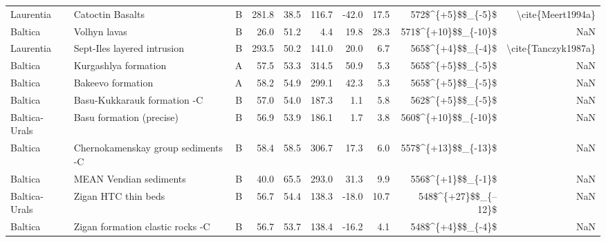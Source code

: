 \begin{longtable}{p{1 in}p{1 in}rrrrrrrr}
                     Laurentia &                                   Catoctin Basalts &      B &     281.8 &      38.5 & 116.7 & -42.0 &      17.5 &      572\$\textasciicircum \{+5\}\$\$\_\{-5\}\$ &                                  \textbackslash cite\{Meert1994a\} \\
                       Baltica &                                       Volhyn lavas &      B &      26.0 &      51.2 &   4.4 &  19.8 &      28.3 &    571\$\textasciicircum \{+10\}\$\$\_\{-10\}\$ &                                                NaN \\
                     Laurentia &                        Sept-Iles layered intrusion &      B &     293.5 &      50.2 & 141.0 &  20.0 &       6.7 &      565\$\textasciicircum \{+4\}\$\$\_\{-4\}\$ &                                \textbackslash cite\{Tanczyk1987a\} \\
                       Baltica &                               Kurgashlya formation &      A &      57.5 &      53.3 & 314.5 &  50.9 &       5.3 &      565\$\textasciicircum \{+5\}\$\$\_\{-5\}\$ &                                                NaN \\
                       Baltica &                                  Bakeevo formation &      A &      58.2 &      54.9 & 299.1 &  42.3 &       5.3 &      565\$\textasciicircum \{+5\}\$\$\_\{-5\}\$ &                                                NaN \\
                       Baltica &                        Basu-Kukkarauk formation -C &      B &      57.0 &      54.0 & 187.3 &   1.1 &       5.8 &      562\$\textasciicircum \{+5\}\$\$\_\{-5\}\$ &                                                NaN \\
                 Baltica-Urals &                          Basu formation  (precise) &      B &      56.9 &      53.9 & 186.1 &   1.7 &       3.8 &    560\$\textasciicircum \{+10\}\$\$\_\{-10\}\$ &                                                NaN \\
                       Baltica &                 Chernokamenskay group sediments -C &      B &      58.4 &      58.5 & 306.7 &  17.3 &       6.0 &    557\$\textasciicircum \{+13\}\$\$\_\{-13\}\$ &                                                NaN \\
                       Baltica &                             MEAN Vendian sediments &      B &      40.0 &      65.5 & 293.0 &  31.3 &       9.9 &      556\$\textasciicircum \{+1\}\$\$\_\{-1\}\$ &                                                NaN \\
                 Baltica-Urals &                                Zigan HTC thin beds &      B &      56.7 &      54.4 & 138.3 & -18.0 &      10.7 &   548\$\textasciicircum \{+27\}\$\$\_\{--12\}\$ &                                                NaN \\
                       Baltica &                   Zigan formation clastic rocks -C &      B &      56.7 &      53.7 & 138.4 & -16.2 &       4.1 &      548\$\textasciicircum \{+4\}\$\$\_\{-4\}\$ &                                                NaN \\
\end{longtable}
